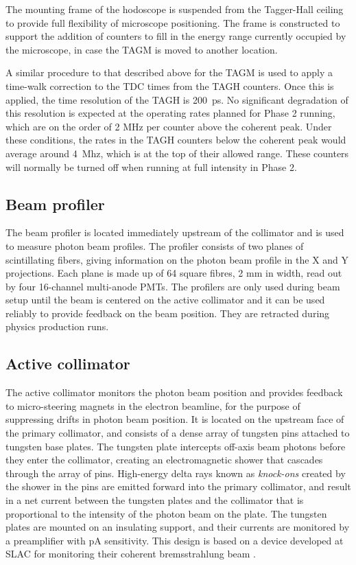 The mounting frame of the hodoscope is suspended from the Tagger-Hall ceiling
to provide full flexibility of microscope positioning. The frame is constructed
to support the addition of counters to fill in the energy range currently
occupied by the microscope, in case the TAGM is moved to another location.

A similar procedure to that described above for the TAGM is used to apply
a time-walk correction to the TDC times from the TAGH counters. Once this
is applied, the time resolution of the TAGH is 200~ps. No significant
degradation of this resolution is expected at the operating rates planned
for Phase 2 running, which are on the order of 2 MHz per counter above
the coherent peak. Under these conditions, the rates in the TAGH counters
below the coherent peak would average around 4~Mhz, which is at the top
of their allowed range. These counters will normally be turned off when
running at full intensity in Phase 2.

\subsection{Beam profiler}
The beam profiler is located immediately upstream of the collimator and is
used to measure photon beam profiles. The profiler consists of two planes
of scintillating fibers, giving information on the photon beam profile
in the X and Y projections. Each plane is made up of 64 square fibres,
2 mm in width, read out by four 16-channel multi-anode PMTs. The profilers
are only used during beam setup until the beam is centered on the active collimator and it can be used reliably to provide feedback on
the beam position. They are retracted during physics production runs.

\subsection{Active collimator \label{sec:coll}}
The active collimator monitors the photon beam position and provides
feedback to micro-steering magnets in the electron beamline, for the
purpose of suppressing drifts in photon beam position. It is located on
the upstream face of the primary collimator, and consists of a dense
array of tungsten pins attached to tungsten base plates. The tungsten
plate intercepts off-axis beam photons before they enter the collimator,
creating an electromagnetic shower that cascades through the array
of pins. High-energy delta rays known as {\em knock-ons} created by the
shower in the pins are emitted forward into the primary collimator, and
result in a net current between the tungsten plates and the collimator
that is proportional to the intensity of the photon beam on the plate.
The tungsten plates are mounted on an insulating support, and their
currents are monitored by a preamplifier with pA sensitivity. This
design is based on a device developed at SLAC for monitoring
their coherent bremsstrahlung beam \cite{Miller:1973yi}.

